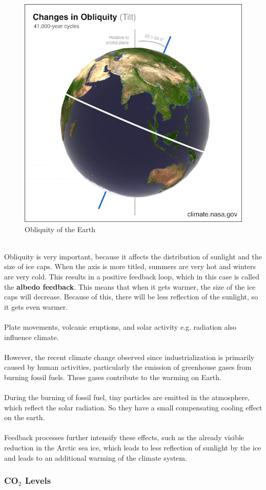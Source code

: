 \documentclass[../summary.tex]{subfiles}
\begin{document}
\begin{figure}[h]
	\centering
	\includegraphics[width=0.5\linewidth]{images/obliquity_with_border}
	\caption[]{Obliquity of the Earth}
	\label{fig:obliquity}
\end{figure}
\ \\
Obliquity is very important, because it affects the distribution of sunlight and the size of ice caps. When the axis is more titled, summers are very hot and winters are very cold. This results in a positive feedback loop, which in this case is called the \textbf{albedo feedback}. This means that when it gets warmer, the size of the ice caps will decrease. Because of this, there will be less reflection of the sunlight, so it gets even warmer.\\
\\
Plate movements, volcanic eruptions, and solar activity e.g. radiation also influence climate.\\
\\
However, the recent climate change observed since industrialization is primarily caused by human activities, particularly the emission of greenhouse gases from burning fossil fuels. These gases contribute to the warming on Earth.\\
\\
During the burning of fossil fuel, tiny particles are emitted in the atmosphere, which reflect the solar radiation.  So they have a small compensating cooling effect on the earth.\\
\\
Feedback processes further intensify these effects, such as the already visible reduction in the Arctic sea ice, which leads to less reflection of sunlight by the ice
and leads to an additional warming of the climate system.
\newpage
\subsubsection{CO$_2$ Levels}
\end{document}

